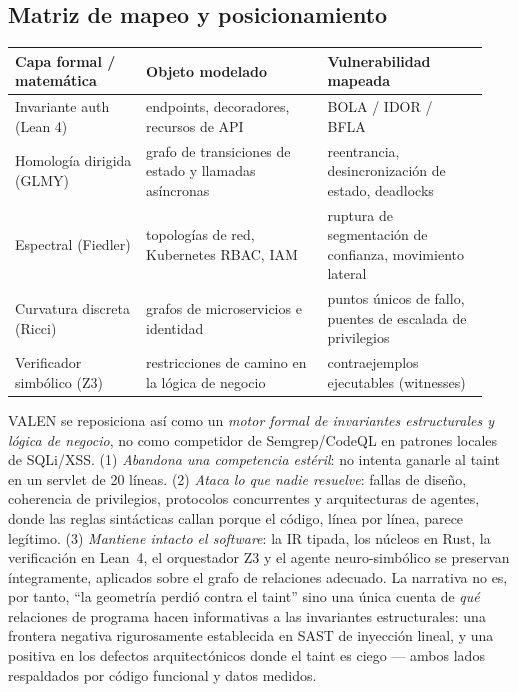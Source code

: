 \documentclass[11pt]{article}
\begin{document}
\subsection{Matriz de mapeo y posicionamiento}
\begin{center}
\small
\begin{tabular}{@{}p{0.26\linewidth}p{0.36\linewidth}p{0.32\linewidth}@{}}
\toprule
\textbf{Capa formal / matemática} & \textbf{Objeto modelado} & \textbf{Vulnerabilidad mapeada} \\
\midrule
Invariante auth (Lean 4) & endpoints, decoradores, recursos de API & BOLA / IDOR / BFLA \\
Homología dirigida (GLMY) & grafo de transiciones de estado y llamadas asíncronas & reentrancia, desincronización de estado, deadlocks \\
Espectral (Fiedler) & topologías de red, Kubernetes RBAC, IAM & ruptura de segmentación de confianza, movimiento lateral \\
Curvatura discreta (Ricci) & grafos de microservicios e identidad & puntos únicos de fallo, puentes de escalada de privilegios \\
Verificador simbólico (Z3) & restricciones de camino en la lógica de negocio & contraejemplos ejecutables (witnesses) \\
\bottomrule
\end{tabular}
\end{center}
VALEN se reposiciona así como un \emph{motor formal de invariantes
estructurales y lógica de negocio}, no como competidor de Semgrep/CodeQL en
patrones locales de SQLi/XSS. (1) \emph{Abandona una competencia estéril}: no
intenta ganarle al taint en un servlet de 20 líneas. (2) \emph{Ataca lo que nadie
resuelve}: fallas de diseño, coherencia de privilegios, protocolos concurrentes y
arquitecturas de agentes, donde las reglas sintácticas callan porque el código,
línea por línea, parece legítimo. (3) \emph{Mantiene intacto el software}: la IR
tipada, los núcleos en Rust, la verificación en Lean~4, el orquestador Z3 y el
agente neuro-simbólico se preservan íntegramente, aplicados sobre el grafo de
relaciones adecuado. La narrativa no es, por tanto, ``la geometría perdió contra
el taint'' sino una única cuenta de \emph{qué} relaciones de programa hacen
informativas a las invariantes estructurales: una frontera negativa rigurosamente
establecida en SAST de inyección lineal, y una positiva en los defectos
arquitectónicos donde el taint es ciego --- ambos lados respaldados por código
funcional y datos medidos.
\end{document}
